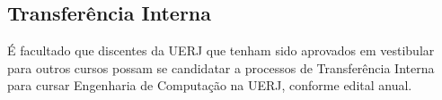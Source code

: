 \subsection{Transferência Interna}
É facultado que discentes da UERJ que tenham sido aprovados em vestibular para outros cursos possam se candidatar a processos de Transferência Interna para cursar Engenharia de Computação na UERJ, conforme edital anual.




